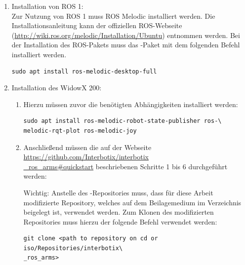 \begin{enumerate}[label*=\arabic*.]
    \item Installation von ROS 1:\\
    Zur Nutzung von ROS 1 muss ROS Melodic installiert werden. Die Installationsanleitung kann der offiziellen ROS-Webseite (\href{http://wiki.ros.org/melodic/Installation/Ubuntu}{http://wiki.ros.org/melodic/Installation/Ubuntu}) entnommen werden. Bei der Installation des ROS-Pakets muss das -Paket mit dem folgenden Befehl installiert werden.

        \begin{lstlisting}[style=bash]
sudo apt install ros-melodic-desktop-full
        \end{lstlisting}

    \item Installation des WidowX 200:
        \begin{enumerate}[label*=\arabic*.]
            \item Hierzu müssen zuvor die benötigten Abhängigkeiten installiert werden:

                \begin{lstlisting}[style=bash]
sudo apt install ros-melodic-robot-state-publisher ros-\
melodic-rqt-plot ros-melodic-joy
                \end{lstlisting}

            \item Anschließend müssen die auf der Webseite \href{https://github.com/Interbotix/interbotix_ros_arms#quickstart}{https://github.com/Interbotix/interbotix\\\_ros\_arms\#quickstart} beschriebenen Schritte 1 bis 6 durchgeführt werden:

            \begin{redbox}{Wichtig:}
                Anstelle des -Repositories muss, dass für diese Arbeit modifizierte Repository, welches auf dem Beilagemedium im Verzeichnis  beigelegt ist, verwendet werden. Zum Klonen des modifizierten Repositories muss hierzu der folgende Befehl verwendet werden:

                \begin{lstlisting}[style=bash]
git clone <path to repository on cd or iso/Repositories/interbotix\
_ros_arms>
                \end{lstlisting}
            \end{redbox}


\end{enumerate}
\end{enumerate}

